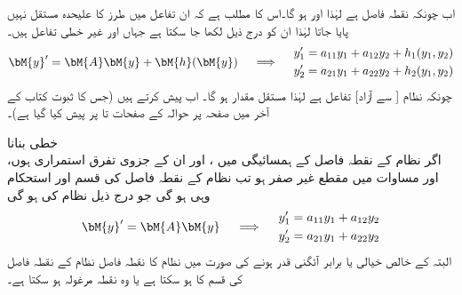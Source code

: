اب چونکہ  نقطہ فاصل ہے لہٰذا اور    ہو گا۔اس کا مطلب ہے کہ ان تفاعل میں  طرز کا علیحدہ مستقل نہیں پایا جاتا لہٰذا ان کو درج ذیل لکھا جا سکتا ہے جہاں  اور  غیر خطی تفاعل ہیں۔
\begin{gather}\label{مساوات_نظام_غیر_خطی_ترکیب_مرحلہ_ب}
\begin{aligned}
\bM{y}'=\bM{A}\bM{y}+\bM{h}(\bM{y})
\end{aligned} \quad \implies \quad 
\begin{aligned}
y_1'&=a_{11}y_1+a_{12}y_2+h_1(y_1,y_2)\\
y_2'&=a_{21}y_1+a_{22}y_2+h_2(y_1,y_2)
\end{aligned}
\end{gather}
چونکہ نظام   [ سے آزاد] تفاعل ہے لہٰذا  مستقل مقدار ہو گا۔ اب  پیش کرتے ہیں (جس کا ثبوت کتاب کے آخر میں صفحہ  پر حوالہ \cite{حوالہ_کریزگ_الف_سات} کے صفحات  تا  پر پیش کیا گیا ہے)۔

\quad خطی بنانا\\
اگر نظام  کے نقطہ فاصل  کے ہمسائیگی میں  ،  اور ان کے جزوی تفرق استمراری ہوں، اور  مساوات  میں مقطع  غیر صفر  ہو تب نظام  کے نقطہ فاصل کی قسم اور استحکام وہی ہو گی جو درج ذیل  نظام کی ہو گی
\begin{gather}\label{مساوات_نظام_غیر_خطی_ترکیب_مرحلہ_پ}
\begin{aligned}
\bM{y}'=\bM{A}\bM{y}
\end{aligned} \quad \implies \quad 
\begin{aligned}
y_1'&=a_{11}y_1+a_{12}y_2\\
y_2'&=a_{21}y_1+a_{22}y_2
\end{aligned}
\end{gather}
البتہ  کے خالص خیالی یا برابر آئگنی قدر ہونے کی صورت میں نظام  کا نقطہ فاصل نظام  کے نقطہ فاصل کی قسم کا ہو سکتا ہے یا وہ نقطہ مرغولہ ہو سکتا ہے۔ 


